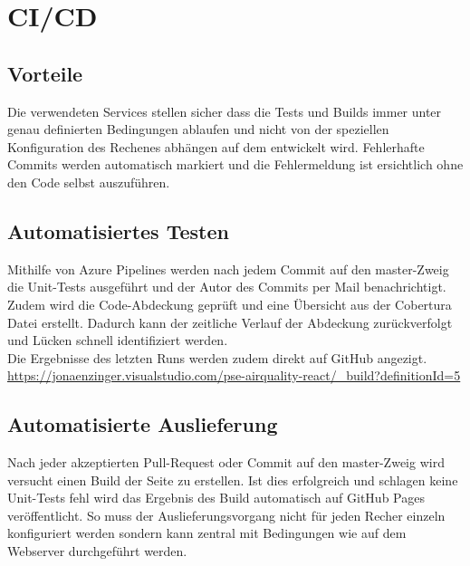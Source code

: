 \section{CI/CD}

\subsection{Vorteile}
Die verwendeten Services stellen sicher dass die Tests und Builds immer unter genau definierten Bedingungen
ablaufen und nicht von der speziellen Konfiguration des Rechenes abhängen auf dem entwickelt wird.
Fehlerhafte Commits werden automatisch markiert und die Fehlermeldung ist ersichtlich ohne den Code selbst
auszuführen.

\subsection{Automatisiertes Testen}

Mithilfe von Azure Pipelines werden nach jedem Commit auf den master-Zweig die 
Unit-Tests ausgeführt 
und der Autor des Commits per Mail benachrichtigt. Zudem wird die Code-Abdeckung geprüft und eine Übersicht
aus der Cobertura Datei erstellt. Dadurch kann der zeitliche Verlauf der Abdeckung zurückverfolgt und Lücken
schnell identifiziert werden. \\
Die Ergebnisse des letzten Runs werden zudem direkt auf GitHub angezigt.\\
\url{https://jonaenzinger.visualstudio.com/pse-airquality-react/_build?definitionId=5}

\subsection{Automatisierte Auslieferung}

Nach jeder akzeptierten Pull-Request oder Commit auf den master-Zweig wird versucht einen Build der Seite
zu erstellen. Ist dies erfolgreich und schlagen keine Unit-Tests fehl wird das Ergebnis des Build
automatisch auf GitHub Pages veröffentlicht. So muss der Auslieferungsvorgang nicht für jeden Recher
einzeln konfiguriert werden sondern kann zentral mit Bedingungen wie auf dem Webserver durchgeführt werden.